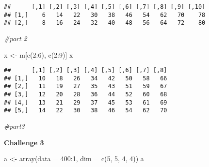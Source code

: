 \documentclass[
]{article}
\newenvironment{Shaded}{\begin{snugshade}}{\end{snugshade}}
\newcommand{\AttributeTok}[1]{\textcolor[rgb]{0.77,0.63,0.00}{#1}}
\newcommand{\CommentTok}[1]{\textcolor[rgb]{0.56,0.35,0.01}{\textit{#1}}}
\newcommand{\DecValTok}[1]{\textcolor[rgb]{0.00,0.00,0.81}{#1}}
\newcommand{\FunctionTok}[1]{\textcolor[rgb]{0.00,0.00,0.00}{#1}}
\newcommand{\NormalTok}[1]{#1}
\newcommand{\OtherTok}[1]{\textcolor[rgb]{0.56,0.35,0.01}{#1}}
\newcommand{\SpecialCharTok}[1]{\textcolor[rgb]{0.00,0.00,0.00}{#1}}
\begin{document}
\begin{verbatim}
##      [,1] [,2] [,3] [,4] [,5] [,6] [,7] [,8] [,9] [,10]
## [1,]    6   14   22   30   38   46   54   62   70    78
## [2,]    8   16   24   32   40   48   56   64   72    80
\end{verbatim}

\begin{Shaded}
\begin{Highlighting}[]
\CommentTok{\#part 2}

\NormalTok{x }\OtherTok{\textless{}{-}}\NormalTok{ m[}\FunctionTok{c}\NormalTok{(}\DecValTok{2}\SpecialCharTok{:}\DecValTok{6}\NormalTok{), }\FunctionTok{c}\NormalTok{(}\DecValTok{2}\SpecialCharTok{:}\DecValTok{9}\NormalTok{)]}
\NormalTok{x}
\end{Highlighting}
\end{Shaded}

\begin{verbatim}
##      [,1] [,2] [,3] [,4] [,5] [,6] [,7] [,8]
## [1,]   10   18   26   34   42   50   58   66
## [2,]   11   19   27   35   43   51   59   67
## [3,]   12   20   28   36   44   52   60   68
## [4,]   13   21   29   37   45   53   61   69
## [5,]   14   22   30   38   46   54   62   70
\end{verbatim}

\begin{Shaded}
\begin{Highlighting}[]
\CommentTok{\#part3}
\end{Highlighting}
\end{Shaded}

\textbf{Challenge 3}

\begin{Shaded}
\begin{Highlighting}[]
\NormalTok{a }\OtherTok{\textless{}{-}} \FunctionTok{array}\NormalTok{(}\AttributeTok{data =} \DecValTok{400}\SpecialCharTok{:}\DecValTok{1}\NormalTok{, }\AttributeTok{dim =} \FunctionTok{c}\NormalTok{(}\DecValTok{5}\NormalTok{, }\DecValTok{5}\NormalTok{, }\DecValTok{4}\NormalTok{, }\DecValTok{4}\NormalTok{))}
\NormalTok{a}
\end{Highlighting}
\end{Shaded}
\end{document}
